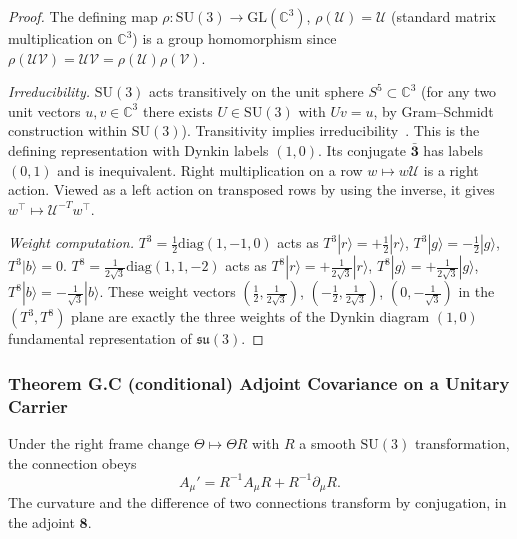 \begin{proof}
The defining map $\rho:\mathrm{SU}(3)\to\mathrm{GL}(\mathbb{C}^3)$,
$\rho(\mathcal{U}) = \mathcal{U}$ (standard matrix multiplication on $\mathbb{C}^3$)
is a group homomorphism since $\rho(\mathcal{U}\mathcal{V})=\mathcal{U}\mathcal{V}=\rho(\mathcal{U})\rho(\mathcal{V})$.

\emph{Irreducibility.}
$\mathrm{SU}(3)$ acts transitively on the unit sphere $S^5\subset\mathbb{C}^3$ (for any two unit
vectors $u,v\in\mathbb{C}^3$ there exists $U\in\mathrm{SU}(3)$ with $Uv=u$, by Gram–Schmidt
construction within $\mathrm{SU}(3)$).  Transitivity implies irreducibility~\cite{bröcker2003representations}.
This is the defining representation with Dynkin labels $(1,0)$.
Its conjugate $\bar{\mathbf 3}$ has labels $(0,1)$ and is inequivalent.
Right multiplication on a row $w\mapsto w\mathcal U$ is a right action.
Viewed as a left action on transposed rows by using the inverse, it
gives $w^\top\mapsto\mathcal U^{-T}w^\top$.

\emph{Weight computation.}
$T^3=\frac{1}{2}\mathrm{diag}(1,-1,0)$ acts as $T^3|r\rangle=+\frac{1}{2}|r\rangle$,
$T^3|g\rangle=-\frac{1}{2}|g\rangle$, $T^3|b\rangle=0$.
$T^8=\frac{1}{2\sqrt{3}}\mathrm{diag}(1,1,-2)$ acts as
$T^8|r\rangle=+\frac{1}{2\sqrt{3}}|r\rangle$,
$T^8|g\rangle=+\frac{1}{2\sqrt{3}}|g\rangle$,
$T^8|b\rangle=-\frac{1}{\sqrt{3}}|b\rangle$.
These weight vectors $(\frac{1}{2},\frac{1}{2\sqrt{3}})$, $(-\frac{1}{2},\frac{1}{2\sqrt{3}})$,
$(0,-\frac{1}{\sqrt{3}})$ in the $(T^3,T^8)$ plane are exactly the three weights
of the Dynkin diagram $(1,0)$ fundamental representation of $\mathfrak{su}(3)$.
\end{proof}

\subsubsection*{Theorem G.C (conditional) Adjoint Covariance on a Unitary Carrier}
\begin{tcolorbox}[colback=blue!3!white,colframe=blue!40!black,title=Theorem G.C (conditional on local SU(3) carrier symmetry)]
Under the right frame change $\Theta\mapsto\Theta R$ with $R$ a smooth
$\mathrm{SU}(3)$ transformation, the connection obeys
\begin{equation}
A_\mu'=R^{-1}A_\mu R+R^{-1}\partial_\mu R.
\label{eq:GC_gauge_transf}
\end{equation}
The curvature and the difference of two connections transform by
conjugation, in the adjoint $\mathbf8$.
\end{tcolorbox}

